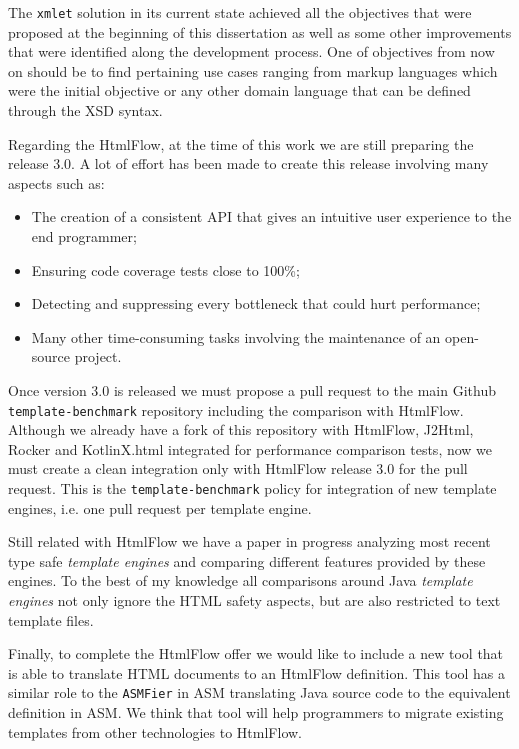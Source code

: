 The \texttt{xmlet} solution in its current state achieved all the objectives that were proposed at the beginning of this dissertation as well as some other improvements that were identified along the development process. One of objectives from now on should be to find pertaining use cases ranging from markup languages which were the initial objective or any other domain language that can be defined through the \ac{XSD} syntax.

\noindent
Regarding the HtmlFlow, at the time of this work we are still preparing the release 3.0. A lot of effort has been made to create this release involving many aspects such as: 

\begin{itemize}
	\item The creation of a consistent \ac{API} that gives an intuitive user experience to the end programmer;
	\item Ensuring code coverage tests close to 100\%; 
	\item Detecting and suppressing every bottleneck that could hurt performance;
	\item Many other time-consuming tasks involving the maintenance of an open-source project.
\end{itemize}

\noindent
Once version 3.0 is released we must propose a pull request to the main Github \texttt{template-benchmark} repository including the comparison with HtmlFlow. Although we already have a fork of this repository with HtmlFlow, J2Html, Rocker and KotlinX.html integrated for performance comparison tests, now we must create a clean integration only with HtmlFlow release 3.0 for the pull request. This is the \texttt{template-benchmark} policy for integration of new template engines, i.e. one pull request per template engine.

\noindent
Still related with HtmlFlow we have a paper in progress analyzing most recent type safe \textit{template engines} and comparing different features provided by these engines. To the best of my knowledge all comparisons around Java \textit{template engines} not only ignore the \ac{HTML} safety aspects, but are also restricted to text template files. 

\noindent
Finally, to complete the HtmlFlow offer we would like to include a new tool that is able to translate \ac{HTML} documents to an HtmlFlow definition. This tool has a similar role to the \texttt{ASMFier} in ASM translating Java source code to the equivalent definition in ASM. We think that tool will help programmers to migrate existing templates from other technologies to HtmlFlow.

